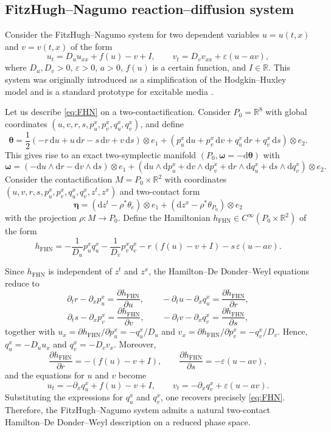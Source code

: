 \documentclass[11pt,a4paper]{article}
\newcommand{\dd}{\mathrm{d}}
\theoremstyle{plain} \newtheorem{theorem}{Theorem}[section] \newtheorem{proposition}[theorem]{Proposition} \newtheorem{corollary}[theorem]{Corollary} \newtheorem{lemma}[theorem]{Lemma} \theoremstyle{definition} \newtheorem{definition}[theorem]{Definition} \theoremstyle{remark} \newtheorem{remark}[theorem]{Remark} \newtheorem{example}[theorem]{Example} %
\begin{document}
\subsection{FitzHugh--Nagumo reaction--diffusion system}
\label{subsec:FHN}

Consider the FitzHugh--Nagumo system for two dependent variables $u=u(t,x)$ and $v=v(t,x)$ of the form
\begin{equation}\label{eq:FHN}
u_t=D_u u_{xx}+f(u)-v+I,\qquad
v_t=D_v v_{xx}+\varepsilon(u-a v),
\end{equation}
where \(D_u,D_v>0\), \(\varepsilon>0\), \(a>0\), $f(u)$ is a certain function, and \(I\in\mathbb R\). This system was originally introduced as a simplification of the Hodgkin--Huxley model and is a standard prototype for excitable media \cite{FitzHugh1961,Hastings1982FHN}.

Let us describe \eqref{eq:FHN} on a two-contactification. Consider \(P_0=\mathbb R^8\) with global coordinates \((u,v,r,s,p_u^x,p_v^x,q_u^x,q_v^x)\), and define
\[
\bm \theta =\frac12(-r\,\dd u+u\,\dd r-s\,\dd v+v\,\dd s)\otimes e_1+(p_u^x\,\dd u+p_v^x\,\dd v+q_u^x\,\dd r+q_v^x\,\dd s)\otimes e_2.
\]
This gives rise to an exact  two-symplectic manifold $(P_0,\bm\omega=-\dd\bm\theta)$ with \[\bm \omega=(-\dd u\wedge \dd r-\dd v\wedge \dd s)\otimes e_1+(\dd u\wedge \dd p_u^x+\dd v\wedge \dd p_v^x+\dd r\wedge \dd q_u^x+\dd s\wedge \dd q_v^x)\otimes e_2.\] Consider the contactification \(M=P_0\times\mathbb R^2\) with coordinates \((u,v,r,s,p_u^x,p_v^x,q_u^x,q_v^x,z^t,z^x)\) and two-contact form 
$$
{\bm \eta}=(\dd z^t-\rho^*\theta_e)\otimes e_1+(\dd z^x-\rho^*\theta_{P_0})\otimes e_2
$$
with  the projection $\rho:M\rightarrow P_0$. Define the Hamiltonian $h_{\mathrm{FHN}}\in C^\infty(P_0\times \mathbb{R}^2)$ of the form \[ h_{\mathrm{FHN}}= -\frac1{D_u}p_u^x q_u^x-\frac1{D_v}p_v^x q_v^x-r\,(f(u)-v+I)-s\,\varepsilon(u-a v). \]

Since \(h_{\mathrm{FHN}}\) is independent of \(z^t\) and \(z^x\), the Hamilton--De Donder--Weyl equations reduce to
\[
\partial_t r-\partial_x p_u^x=\frac{\partial h_{\mathrm{FHN}}}{\partial u},\qquad
-\partial_t u-\partial_x q_u^x=\frac{\partial h_{\mathrm{FHN}}}{\partial r},
\]
\[
\partial_t s-\partial_x p_v^x=\frac{\partial h_{\mathrm{FHN}}}{\partial v},\qquad
-\partial_t v-\partial_x q_v^x=\frac{\partial h_{\mathrm{FHN}}}{\partial s},
\]
together with \(u_x=\partial h_{\mathrm{FHN}}/\partial p_u^x=-q_u^x/D_u\) and \(v_x=\partial h_{\mathrm{FHN}}/\partial p_v^x=-q_v^x/D_v\). Hence, \(q_u^x=-D_u u_x\) and \(q_v^x=-D_v v_x\). Moreover,
\[
\frac{\partial h_{\mathrm{FHN}}}{\partial r}=-(f(u)-v+I),\qquad
\frac{\partial h_{\mathrm{FHN}}}{\partial s}=-\varepsilon(u-a v),
\]
and the equations for \(u\) and \(v\) become
\[
u_t=-\partial_x q_u^x+f(u)-v+I,\qquad
v_t=-\partial_x q_v^x+\varepsilon(u-a v).
\]
Substituting the expressions for \(q_u^x\) and \(q_v^x\), one recovers precisely \eqref{eq:FHN}. Therefore, the FitzHugh--Nagumo system admits a natural two-contact Hamilton--De Donder--Weyl description on a reduced phase space.
\end{document}

